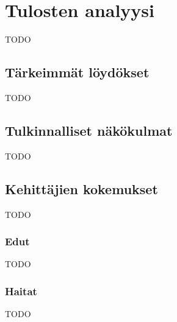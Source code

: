 \vspace{21.5pt}
\chapter{Tulosten analyysi}
TODO

\section{Tärkeimmät löydökset}

TODO

\section{Tulkinnalliset näkökulmat}

TODO


\section{Kehittäjien kokemukset}

TODO

\subsection{Edut}

TODO

\subsection{Haitat}

TODO
